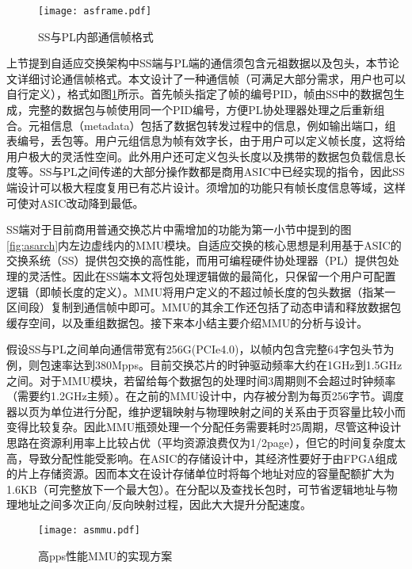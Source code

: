 \label{chap441}

\begin{figure}[!ht]
	\centering 
	\vspace{-1.5mm} 
	\texttt{[image: asframe.pdf]}
	\caption{SS与PL内部通信帧格式} \label{fig:asframe}
\end{figure}

上节提到自适应交换架构中SS端与PL端的通信须包含元祖数据以及包头，本节论文详细讨论通信帧格式。本文设计了一种通信帧（可满足大部分需求，用户也可以自行定义），格式如图\ref{fig:asframe}所示。首先帧头指定了帧的编号PID，帧由SS中的数据包生成，完整的数据包与帧使用同一个PID编号，方便PL协处理器处理之后重新组合。元祖信息（metadata）包括了数据包转发过程中的信息，例如输出端口，组表编号，丢包等。用户元组信息为帧有效字长，由于用户可以定义帧长度，这将给用户极大的灵活性空间。此外用户还可定义包头长度以及携带的数据包负载信息长度等。SS与PL之间传递的大部分操作数都是商用ASIC中已经实现的指令，因此SS端设计可以极大程度复用已有芯片设计。须增加的功能只有帧长度信息等域，这样可使对ASIC改动降到最低。

\label{chap442}

SS端对于目前商用普通交换芯片中需增加的功能为第一小节中提到的图 \ref{fig:asarch}内左边虚线内的MMU模块。自适应交换的核心思想是利用基于ASIC的交换系统（SS）提供包交换的高性能，而用可编程硬件协处理器（PL）提供包处理的灵活性。因此在SS端本文将包处理逻辑做的最简化，只保留一个用户可配置逻辑（即帧长度的定义）。MMU将用户定义的不超过帧长度的包头数据（指某一区间段）复制到通信帧中即可。MMU的其余工作还包括了动态申请和释放数据包缓存空间，以及重组数据包。接下来本小结主要介绍MMU的分析与设计。

假设SS与PL之间单向通信带宽有256G(PCIe4.0)，以帧内包含完整64字包头节为例，则包速率达到380Mpps。目前交换芯片的时钟驱动频率大约在1GHz到1.5GHz之间。对于MMU模块，若留给每个数据包的处理时间3周期则不会超过时钟频率（需要约1.2GHz主频）。在之前的MMU设计中，内存被分割为每页256字节。调度器以页为单位进行分配，维护逻辑映射与物理映射之间的关系由于页容量比较小而变得比较复杂。因此MMU瓶颈处理一个分配任务需要耗时25周期，尽管这种设计思路在资源利用率上比较占优（平均资源浪费仅为1/2page），但它的时间复杂度太高，导致分配性能受影响。在ASIC的存储设计中，其经济性要好于由FPGA组成的片上存储资源。因而本文在设计存储单位时将每个地址对应的容量配额扩大为1.6KB（可完整放下一个最大包）。在分配以及查找长包时，可节省逻辑地址与物理地址之间多次正向/反向映射过程，因此大大提升分配速度。

\begin{figure}[!ht]
	\centering 
	\vspace{-1.5mm} 
	\texttt{[image: asmmu.pdf]}
	\caption{高pps性能MMU的实现方案} \label{fig:asmmu}
\end{figure}

